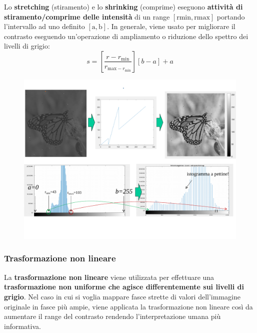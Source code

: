 \documentclass[a4paper]{article}
\begin{document}
	 Lo \textcolor{Red3}{\textbf{stretching}} (stiramento) e lo \textcolor{Red3}{\textbf{shrinking}} (comprime) eseguono \textbf{attività di stiramento/comprime delle intensità} di un range $\left[\text{rmin}, \text{rmax}\right]$ portando l'intervallo ad uno definito $\left[\text{a}, \text{b}\right]$. In generale, viene usato per migliorare il contrasto eseguendo un'operazione di ampliamento o riduzione dello spettro dei livelli di grigio:
	 \begin{equation*}
	 	s = \left[\dfrac{r -r_{\text{min}}}{r_{\text{max} - r_{\text{min}}}}\right] \left[b - a\right] + a
	 \end{equation*}
	 \begin{figure}[!htp]
	 	\centering
	 	\includegraphics[width=\textwidth]{img/lab/stretching-shrinking.pdf}
	 \end{figure}\newpage
	
	\subsubsection{Trasformazione non lineare}
	
	La \textcolor{Red3}{\textbf{trasformazione non lineare}} viene utilizzata per effettuare una \textbf{trasformazione non uniforme che agisce differentemente sui livelli di grigio}. Nel caso in cui si voglia mappare fasce strette di valori dell'immagine originale in fasce più ampie, viene applicata la trasformazione non lineare così da aumentare il range del contrasto rendendo l'interpretazione umana più informativa.\newline
	
\end{document}
